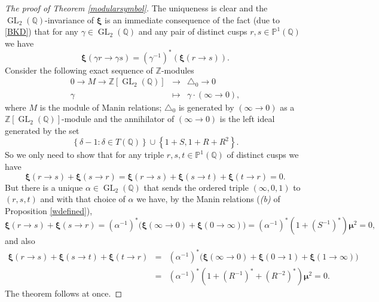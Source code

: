 \documentclass[12pt,amstex,amssymb]{article}
\theoremstyle{plain}
\newcommand{\PP}{\mathbb{P}}
\theoremstyle{definition}
\def\cK{{\cal K}}
\def\Z{{\mathbb Z}}
\def\Q{{\mathbb Q}}
\def\d{\delta}
\newcommand{\be}{\begin{eqnarray*}}
\newcommand{\ee}{\end{eqnarray*}}
\newcommand{\GL}{\operatorname{GL}}
\begin{document}
\begin{proof} [The proof of Theorem \ref{modularsymbol}] The uniqueness is clear and the $\GL_2(\Q)$-invariance of ${\bm\xi}$ is an immediate consequence of the fact (due to \eqref{BKD}) that for any $\gamma\in \GL_2(\Q)$ and any pair of distinct cusps $r,s \in  \PP^1(\Q)$ we have 
$$
{\bm\xi}(\gamma r\to \gamma s) = (\gamma^{-1})^*\left( {\bm\xi}(r\to s) \right). 
$$
Consider the following exact sequence of $\Z$-modules
\be
0\to M\to \Z[\GL_2(\Q)] &\to& \triangle_0 \to 0\\
\gamma &\mapsto& \gamma\cdot (\infty \to 0),
\ee
where $M$ is the module of Manin relations; $\triangle_0$ is generated by $(\infty\to 0)$ as a $\Z[\GL_2(\Q)]$-module and 
the annihilator of $(\infty \to 0)$ is the left ideal generated by the set
$$
\left\{ \d -1 : \d\in T(\Q) \right\} \cup \left\{ 1+S, 1+ R +R^2 \right\}.
$$
%
So we only need to show that for any triple $r,s,t\in \PP^1(\Q)$ of distinct cusps we have 
$$
{\bm\xi}(r\to s) + {\bm\xi}(s\to r) = {\bm\xi}(r\to s) + {\bm\xi}(s\to t) + {\bm\xi}(t\to r) = 0.
$$
But there is a unique $\alpha \in \GL_2(\Q)$ that sends the ordered triple $(\infty, 0, 1)$ to $(r,s,t)$ and with that choice of $\alpha$ we have, by the Manin relations (\textit{(b)} of Proposition \ref{wdefined}),
$$
{\bm\xi}(r\to s) + {\bm\xi}(s\to r) = (\alpha^{-1})^*\bigl({\bm\xi}(\infty \to 0) + {\bm\xi}(0 \to \infty)\bigr) = (\alpha^{-1})^*(1+(S^{-1})^*){{\bm\mu}^2} = 0,
$$
and also
\be
{\bm\xi}(r\to s) + {\bm\xi}(s\to t) + {\bm\xi}(t\to r) 
&=& (\alpha^{-1})^*\bigl({\bm\xi}(\infty \to 0) + {\bm\xi}(0 \to 1) + {\bm\xi}(1 \to \infty)\bigr)\\
&=& (\alpha^{-1})^*(1+(R^{-1})^*+(R^{-2})^*){{\bm\mu}^2} = 0.
\ee
The theorem follows at once.
\end{proof}
\end{document}
